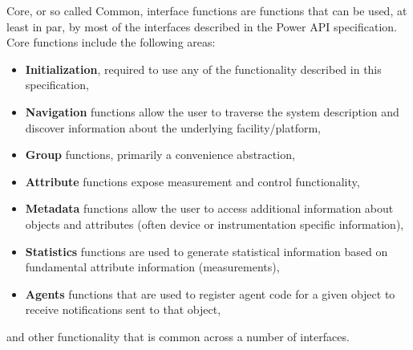 \newcommand{\ArgHdr}{   \begin{center}
			\begin{tabular}{ | p{5cm} | p{2.1cm} | p{7.5cm} |}
			\hline 
			\textbf{Argument(s)} & \textbf{Input } & \textbf{Description} \\  
			 		     & \textbf{and/or} & \\ 
					     & \textbf{Output} & \\ 
			\hline 
}
\newcommand{\ArgLn}[3]{\texttt{#1} & #2 & #3 \\ \hline}
\newcommand{\ArgFtr}{ 	\end{tabular}
			\end{center}
}



Core, or so called Common, interface functions are functions that can be used, at least in par, by most of the interfaces described in the Power API specification. 
Core functions include the following areas:
\begin{itemize}[noitemsep,nolistsep] 
\item{\textbf{Initialization}, required to use any of the functionality described in this specification, }
\item{\textbf{Navigation}  functions allow the user to traverse the system description and discover information about the underlying facility/platform, }
\item{\textbf{Group} functions, primarily a convenience abstraction,}
\item{\textbf{Attribute} functions expose measurement and control functionality, }
\item{\textbf{Metadata} functions allow the user to access additional information about objects and attributes (often device or instrumentation specific information), }
\item{\textbf{Statistics} functions are used to generate statistical information based on fundamental attribute information (measurements),}
\item{\textbf{Agents} functions that are used to register agent code for a given object to receive notifications sent to that object,}
\end{itemize}
and other functionality that is common across a number of interfaces.


